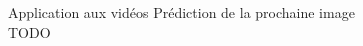 \begin{frame}{Application aux vidéos}
  Prédiction de la prochaine image \\
  \alert{TODO}
\end{frame}
